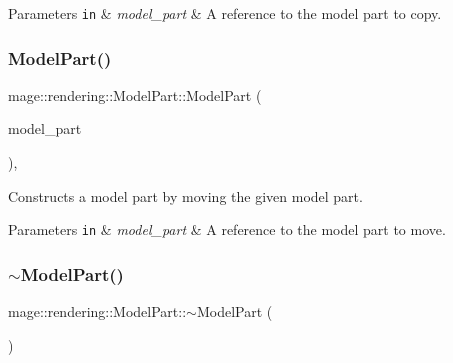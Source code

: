 \begin{DoxyParams}[1]{Parameters}
\mbox{\tt in}  & {\em model\+\_\+part} & A reference to the model part to copy. \\
\hline
\end{DoxyParams}
\mbox{\label{structmage_1_1rendering_1_1_model_part_a843671f80d5c36d05d7d147f65fea890}} 
\subsubsection{\texorpdfstring{Model\+Part()}{ModelPart()}\hspace{0.1cm}{\footnotesize\ttfamily [3/3]}}
{\footnotesize\ttfamily mage\+::rendering\+::\+Model\+Part\+::\+Model\+Part (\begin{DoxyParamCaption}\item[{\mbox{\hyperlink{structmage_1_1rendering_1_1_model_part}{Model\+Part}} \&\&}]{model\+\_\+part }\end{DoxyParamCaption})\hspace{0.3cm}{\ttfamily [default]}, {\ttfamily [noexcept]}}

Constructs a model part by moving the given model part.


\begin{DoxyParams}[1]{Parameters}
\mbox{\tt in}  & {\em model\+\_\+part} & A reference to the model part to move. \\
\hline
\end{DoxyParams}
\mbox{\label{structmage_1_1rendering_1_1_model_part_ac01c98a3cab3fb9692bebbfa6ef3fd18}} 
\subsubsection{\texorpdfstring{$\sim$\+Model\+Part()}{~ModelPart()}}
{\footnotesize\ttfamily mage\+::rendering\+::\+Model\+Part\+::$\sim$\+Model\+Part (\begin{DoxyParamCaption}{ }\end{DoxyParamCaption})\hspace{0.3cm}{\ttfamily [default]}}

